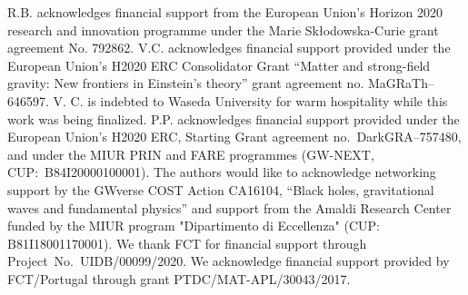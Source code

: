 \documentclass[11pt]{article}
\numberwithin{equation}{section} %
\begin{document}
R.B. acknowledges financial support from the European Union's Horizon 2020 research and innovation programme under the Marie Sk\l odowska-Curie grant agreement No. 792862.
%
V.C. acknowledges financial support provided under the European Union's H2020 ERC 
Consolidator Grant ``Matter and strong-field gravity: New frontiers in Einstein's 
theory'' grant agreement no. MaGRaTh--646597. V. C. is indebted to Waseda University for warm hospitality while this work was being finalized.
%
P.P. acknowledges financial support provided under the European Union's H2020 ERC, Starting 
Grant agreement no.~DarkGRA--757480, and under the MIUR PRIN and FARE programmes (GW-NEXT, CUP:~B84I20000100001).
The authors would like to acknowledge networking support by the GWverse COST Action 
CA16104, ``Black holes, gravitational waves and fundamental physics'' and 
support from the Amaldi Research Center funded by the MIUR program "Dipartimento di 
Eccellenza" (CUP: B81I18001170001).
%
We thank FCT for financial support through Project~No.~UIDB/00099/2020.
%
We acknowledge financial support provided by FCT/Portugal through grant PTDC/MAT-APL/30043/2017.
%

\appendix
\end{document}
